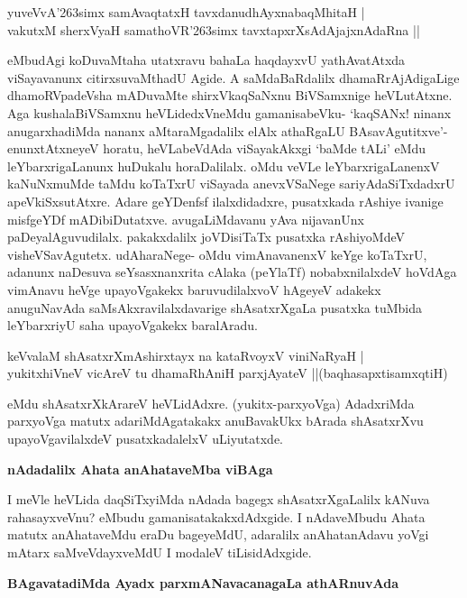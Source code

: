 \begin{shloka}
yuveVvA\char'263simx samAvaqtatxH tavxdanudhAyxnabaqMhitaH |\\
vakutxM sherxVyaH samathoVR\char'263simx tavxtapxrXsAdAjajxnAdaRna ||
\end{shloka}

\noindent
eMbudAgi koDuvaMtaha utatxravu bahaLa haqdayxvU yathAvatAtxda viSayavanunx citirxsuvaMthadU Agide. A saMdaBaRdalilx dhamaRrAjAdigaLige dhamoRVpadeVsha mADuvaMte shirxVkaqSaNxnu BiVSamxnige heVLutAtxne. Aga kushalaBiVSamxnu heVLidedxVneMdu gamanisabeVku- `kaqSANx! ninanx anugarxhadiMda nananx aMtaraMgadalilx elAlx athaRgaLU BAsavAgutitxve'- enunxtAtxneyeV horatu, heVLabeVdAda viSayakAkxgi `baMde tALi' eMdu leYbarxrigaLanunx huDukalu horaDalilalx. oMdu veVLe leYbarxrigaLanenxV kaNuNxmuMde taMdu koTaTxrU viSayada anevxVSaNege sariyAdaSiTxdadxrU apeVkiSxsutAtxre. Adare geYDenfsf ilalxdidadxre, pusatxkada rAshiye ivanige misfgeYDf mADibiDutatxve. avugaLiMdavanu yAva nijavanUnx paDeyalAguvudilalx. pakakxdalilx joVDisiTaTx pusatxka rAshiyoMdeV visheVSavAgutetx. udAharaNege- oMdu vimAnavanenxV keYge koTaTxrU, adanunx naDesuva seYsasxnanxrita cAlaka (peYlaTf) nobabxnilalxdeV hoVdAga vimAnavu heVge upayoVgakekx baruvudilalxvoV hAgeyeV adakekx anuguNavAda saMsAkxravilalxdavarige shAsatxrXgaLa pusatxka tuMbida leYbarxriyU saha upayoVgakekx baralAradu.

\begin{shloka}
keVvalaM shAsatxrXmAshirxtayx na kataRvoyxV viniNaRyaH |\\\label{164}
yukitxhiVneV vicAreV tu dhamaRhAniH parxjAyateV ||\hfill{(baqhasapxtisamxqtiH)}
\end{shloka}

\noindent
eMdu shAsatxrXkArareV heVLidAdxre. (yukitx-parxyoVga) AdadxriMda parxyoVga matutx adariMdAgatakakx anuBavakUkx bArada shAsatxrXvu upayoVgavilalxdeV pusatxkadalelxV uLiyutatxde.

\eject

{\bigskip
\noindent
{\large\bf nAdadalilx Ahata anAhataveMba viBAga}}\label{page164}
\medskip

\noindent
I meVle heVLida daqSiTxyiMda nAdada bagegx shAsatxrXgaLalilx kANuva rahasayxveVnu? eMbudu gamanisatakakxdAdxgide. I nAdaveMbudu Ahata matutx anAhataveMdu eraDu bageyeMdU, adaralilx anAhatanAdavu yoVgi mAtarx saMveVdayxveMdU I modaleV tiLisidAdxgide.

{\bigskip
\noindent
{\large\bf BAgavatadiMda Ayadx parxmANavacanagaLa athARnuvAda}}\label{page164a}
\medskip

